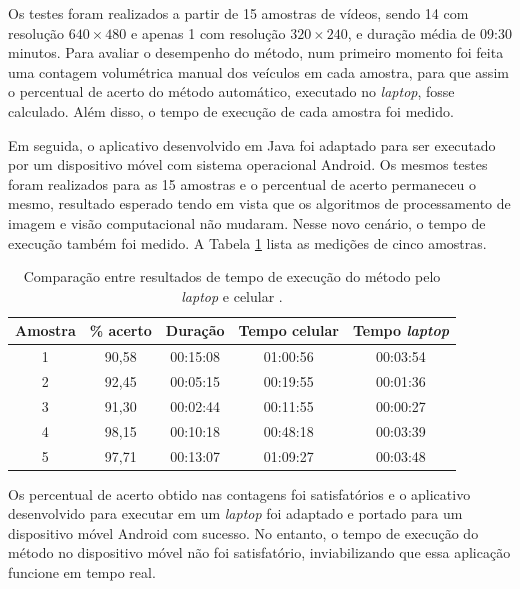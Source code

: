 Os testes foram realizados a partir de 15 amostras de vídeos, sendo 14 com resolução $640\times 480$ e apenas 1 com resolução $320\times 240$, e duração média de 09:30 minutos. Para avaliar o desempenho do método, num primeiro momento foi feita uma contagem volumétrica manual dos veículos em cada amostra, para que assim o percentual de acerto do método automático, executado no \textit{laptop}, fosse calculado. Além disso, o tempo de execução de cada amostra foi medido.

Em seguida, o aplicativo desenvolvido em Java foi adaptado para ser executado por um dispositivo móvel com sistema operacional Android. Os mesmos testes foram realizados para as 15 amostras e o percentual de acerto permaneceu o mesmo, resultado esperado tendo em vista que os algoritmos de processamento de imagem e visão computacional não mudaram. Nesse novo cenário, o tempo de execução também foi medido. A Tabela \ref{tab:feitosa} lista as medições de cinco amostras.


\begin{table}[ht]
  \caption{Comparação entre resultados de tempo de execução do método pelo \textit{laptop} e celular \citep{feitosa:2012:masther}.}
  \label{tab:feitosa}
  \begin{center}
    \begin{tabular}{ccccc}
    \toprule
    \textbf{Amostra} & \textbf{\% acerto} & \textbf{Duração} & \textbf{Tempo celular} & \textbf{Tempo \textit{laptop}}\\
    \midrule
      1 & 90,58 & 00:15:08 & 01:00:56 & 00:03:54\\
      2 & 92,45 & 00:05:15 & 00:19:55 & 00:01:36\\
      3 & 91,30 & 00:02:44 & 00:11:55 & 00:00:27\\
      4 & 98,15 & 00:10:18 & 00:48:18 & 00:03:39\\
      5 & 97,71 & 00:13:07 & 01:09:27 & 00:03:48\\
    \bottomrule
    \end{tabular}
  \end{center}
\end{table}

Os percentual de acerto obtido nas contagens foi satisfatórios e o aplicativo desenvolvido para executar em um \textit{laptop} foi adaptado e portado para um dispositivo móvel Android com sucesso. No entanto, o tempo de execução do método no dispositivo móvel não foi satisfatório, inviabilizando que essa aplicação funcione em tempo real.


